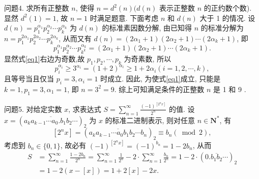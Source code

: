 问题4. 求所有正整数 $n$, 使得 $n=d^2(n)(d(n)$ 表示正整数 $n$ 的正约数个数). 
显然 $d^2(1)=1$, 故 $n=1$ 时满足题意.
下面考虑 $n$ 和 $d(n)$ 大于 1 的情况.
设 $d(n)=p_1^{\alpha_1} p_2^{\alpha_2} \cdots p_k^{\alpha_k}$ 为 $d(n)$ 的标准素因数分解, 由已知得 $n$ 的标准分解为 $n=p_1^{2 \alpha_1} p_2^{2 \alpha_2} \cdots p_k^{2 \alpha_k}$, 从而又有 $d(n)=\left(2 \alpha_1+1\right)\left(2 \alpha_2+1\right) \cdots\left(2 \alpha_k+1\right)$, 即
$$
p_1^{\alpha_1} p_2^{\alpha_2} \cdots p_{k^k}^{\alpha_k}=\left(2 \alpha_1+1\right)\left(2 \alpha_2+1\right) \cdots\left(2 \alpha_k+1\right) . \label{eq1}
$$
显然式\ref{eq1}右边为奇数,故 $p_1, p_2, \cdots, p_k$ 为奇素数, 所以
$$
p_i^{\alpha_i} \geqslant 3^{\alpha_i}=(1+2)^{\alpha_i} \geqslant 1+2 \alpha_i(i=1,2, \cdots, k),
$$
且等号当且仅当 $p_i=3, \alpha_i=1$ 时成立.
因此, 为使式\ref{eq1}成立, 只能是 $k=1, p_1=3, \alpha_1=1$, 即 $n=3^2=9$.
综上可知满足条件的正整数 $n$ 是 1 和 9 .



问题5. 对给定实数 $x$, 求表达式 $S=\sum_{n=1}^{\infty} \frac{(-1)^{\left[2^n x\right]}}{2^n}$ 的值.
设 $x=\left(\overline{a_k a_{k-1} \cdots a_0 . b_1 b_2 \cdots}\right)_2$ 为 $x$ 的标准二进制表示, 则对任意 $n \in \mathbf{N}^*$, 有
$$
\left[2^n x\right]=\left(\overline{a_k a_{k-1} \cdots a_0 b_1 b_2 \cdots b_n}\right)_2 \equiv b_n(\bmod 2),
$$
考虑到 $b_n \in\{0,1\}$, 故必有 $(-1)^{\left[2^n x\right]}=(-1)^{b_n}=1-2 b_n$, 从而
$$
\begin{aligned}
S & =\sum_{n=1}^{\infty} \frac{1-2 b_n}{2^n}=\sum_{n=1}^{\infty} \frac{1}{2^n}-2 \cdot \sum_{n=1}^{\infty} \frac{b_n}{2^n}=1-2 \cdot\left(\overline{0 . b_1 b_2 \cdots}\right)_2 \\
& =1-2(x-[x])=1+2[x]-2 x .
\end{aligned}
$$



